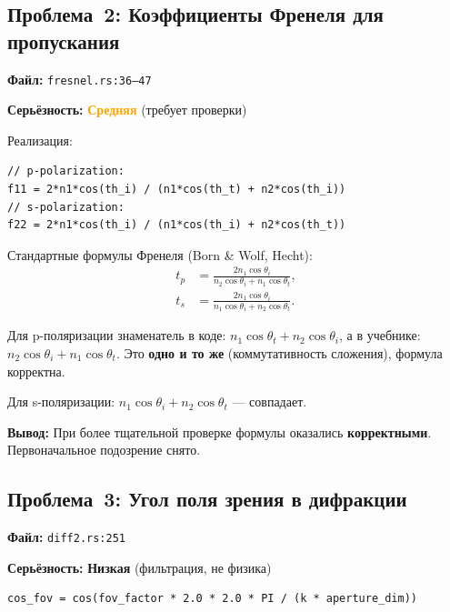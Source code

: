 \documentclass[12pt,a4paper]{article}
\begin{document}
\subsection{Проблема~2: Коэффициенты Френеля для пропускания}

\textbf{Файл:} \texttt{fresnel.rs:36--47}

\textbf{Серьёзность:} \textcolor{orange}{\textbf{Средняя}} (требует проверки)

Реализация:
\begin{lstlisting}[language={}]
// p-polarization:
f11 = 2*n1*cos(th_i) / (n1*cos(th_t) + n2*cos(th_i))
// s-polarization:
f22 = 2*n1*cos(th_i) / (n1*cos(th_i) + n2*cos(th_t))
\end{lstlisting}

Стандартные формулы Френеля (Born \& Wolf, Hecht):
\begin{align}
  t_p &= \frac{2 n_1 \cos\theta_i}{n_2 \cos\theta_i + n_1 \cos\theta_t}, \\
  t_s &= \frac{2 n_1 \cos\theta_i}{n_1 \cos\theta_i + n_2 \cos\theta_t}.
\end{align}

Для p-поляризации знаменатель в коде: $n_1\cos\theta_t + n_2\cos\theta_i$,
а в учебнике: $n_2\cos\theta_i + n_1\cos\theta_t$.
Это \textbf{одно и то же} (коммутативность сложения), формула корректна.

Для s-поляризации: $n_1\cos\theta_i + n_2\cos\theta_t$ --- совпадает.

\textbf{Вывод:} При более тщательной проверке формулы оказались \textcolor{green!50!black}{\textbf{корректными}}.
Первоначальное подозрение снято.

\subsection{Проблема~3: Угол поля зрения в дифракции}

\textbf{Файл:} \texttt{diff2.rs:251}

\textbf{Серьёзность:} \textcolor{yellow!60!black}{\textbf{Низкая}} (фильтрация, не физика)

\begin{lstlisting}[language={}]
cos_fov = cos(fov_factor * 2.0 * 2.0 * PI / (k * aperture_dim))
\end{lstlisting}
\end{document}
